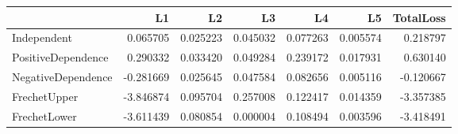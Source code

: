 \begin{tabular}{lrrrrrr}
\toprule
 & L1 & L2 & L3 & L4 & L5 & TotalLoss \\
\midrule
Independent & 0.065705 & 0.025223 & 0.045032 & 0.077263 & 0.005574 & 0.218797 \\
PositiveDependence & 0.290332 & 0.033420 & 0.049284 & 0.239172 & 0.017931 & 0.630140 \\
NegativeDependence & -0.281669 & 0.025645 & 0.047584 & 0.082656 & 0.005116 & -0.120667 \\
FrechetUpper & -3.846874 & 0.095704 & 0.257008 & 0.122417 & 0.014359 & -3.357385 \\
FrechetLower & -3.611439 & 0.080854 & 0.000004 & 0.108494 & 0.003596 & -3.418491 \\
\bottomrule
\end{tabular}
